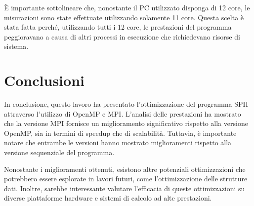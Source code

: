 \documentclass[a4paper,12pt, oneside]{article}
\begin{document}
È importante sottolineare che, nonostante il PC utilizzato disponga di 12 core, le
misurazioni sono state effettuate utilizzando solamente 11 core. Questa scelta è stata
fatta perché, utilizzando tutti i 12 core, le prestazioni del programma peggioravano a
causa di altri processi in esecuzione che richiedevano risorse di sistema.

\section{Conclusioni}

In conclusione, questo lavoro ha presentato l'ottimizzazione del programma SPH attraverso
l'utilizzo di OpenMP e MPI. L'analisi delle prestazioni ha mostrato che la versione MPI
fornisce un miglioramento significativo rispetto alla versione OpenMP, sia in termini di
speedup che di scalabilità. Tuttavia, è importante notare che entrambe le
versioni hanno mostrato miglioramenti rispetto alla versione sequenziale del programma.

Nonostante i miglioramenti ottenuti, esistono altre potenziali ottimizzazioni che potrebbero
essere esplorate in lavori futuri, come l'ottimizzazione delle strutture dati. Inoltre,
sarebbe interessante valutare l'efficacia di queste ottimizzazioni su diverse piattaforme
hardware e sistemi di calcolo ad alte prestazioni.
\end{document}
